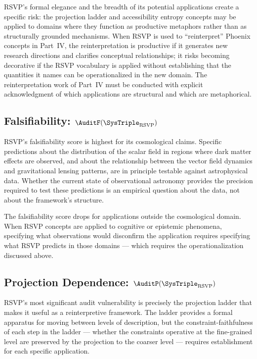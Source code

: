 \begin{dangerzone}
RSVP's formal elegance and the breadth of its potential
applications create a specific risk: the projection
ladder and accessibility entropy concepts may be
applied to domains where they function as productive
metaphors rather than as structurally grounded
mechanisms. When RSVP is used to ``reinterpret'' Phoenix
concepts in Part~IV, the reinterpretation is productive
if it generates new research directions and clarifies
conceptual relationships; it risks becoming decorative
if the RSVP vocabulary is applied without establishing
that the quantities it names can be operationalized
in the new domain. The reinterpretation work of Part~IV
must be conducted with explicit acknowledgment of which
applications are structural and which are metaphorical.
\end{dangerzone}

\subsection{Falsifiability: \texorpdfstring{$\AuditF(\SysTriple_{\mathrm{RSVP}})$}{F(Theta\_RSVP)}}

RSVP's falsifiability score is highest for its
cosmological claims. Specific predictions about the
distribution of the scalar field in regions where
dark matter effects are observed, and about the
relationship between the vector field dynamics and
gravitational lensing patterns, are in principle
testable against astrophysical data. Whether the
current state of observational astronomy provides
the precision required to test these predictions
is an empirical question about the data, not about
the framework's structure.

The falsifiability score drops for applications outside
the cosmological domain. When RSVP concepts are applied
to cognitive or epistemic phenomena, specifying what
observations would disconfirm the application requires
specifying what RSVP predicts in those domains ---
which requires the operationalization discussed above.

\subsection{Projection Dependence: \texorpdfstring{$\AuditP(\SysTriple_{\mathrm{RSVP}})$}{P(Theta\_RSVP)}}

RSVP's most significant audit vulnerability is precisely
the projection ladder that makes it useful as a
reinterpretive framework. The ladder provides a formal
apparatus for moving between levels of description,
but the constraint-faithfulness of each step in the
ladder --- whether the constraints operative at the
fine-grained level are preserved by the projection
to the coarser level --- requires establishment for
each specific application.

